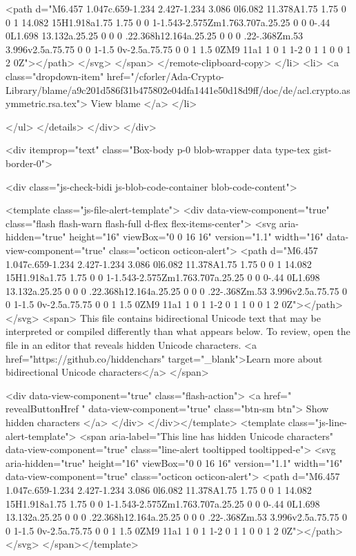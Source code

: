     <path d="M6.457 1.047c.659-1.234 2.427-1.234 3.086 0l6.082 11.378A1.75 1.75 0 0 1 14.082 15H1.918a1.75 1.75 0 0 1-1.543-2.575Zm1.763.707a.25.25 0 0 0-.44 0L1.698 13.132a.25.25 0 0 0 .22.368h12.164a.25.25 0 0 0 .22-.368Zm.53 3.996v2.5a.75.75 0 0 1-1.5 0v-2.5a.75.75 0 0 1 1.5 0ZM9 11a1 1 0 1 1-2 0 1 1 0 0 1 2 0Z"></path>
</svg>
</span>
</remote-clipboard-copy>            </li>
            <li>
              <a class="dropdown-item" href="/cforler/Ada-Crypto-Library/blame/a9c201d586f31b475802e04dfa1441e50d18d9ff/doc/de/acl.crypto.asymmetric.rsa.tex">
                View blame
              </a>
            </li>

        </ul>
      </details>
    </div>
</div>


      
    <div itemprop="text" class="Box-body p-0 blob-wrapper data type-tex  gist-border-0">

        
<div class="js-check-bidi js-blob-code-container blob-code-content">

  <template class="js-file-alert-template">
  <div data-view-component="true" class="flash flash-warn flash-full d-flex flex-items-center">
  <svg aria-hidden="true" height="16" viewBox="0 0 16 16" version="1.1" width="16" data-view-component="true" class="octicon octicon-alert">
    <path d="M6.457 1.047c.659-1.234 2.427-1.234 3.086 0l6.082 11.378A1.75 1.75 0 0 1 14.082 15H1.918a1.75 1.75 0 0 1-1.543-2.575Zm1.763.707a.25.25 0 0 0-.44 0L1.698 13.132a.25.25 0 0 0 .22.368h12.164a.25.25 0 0 0 .22-.368Zm.53 3.996v2.5a.75.75 0 0 1-1.5 0v-2.5a.75.75 0 0 1 1.5 0ZM9 11a1 1 0 1 1-2 0 1 1 0 0 1 2 0Z"></path>
</svg>
    <span>
      This file contains bidirectional Unicode text that may be interpreted or compiled differently than what appears below. To review, open the file in an editor that reveals hidden Unicode characters.
      <a href="https://github.co/hiddenchars" target="_blank">Learn more about bidirectional Unicode characters</a>
    </span>


  <div data-view-component="true" class="flash-action">        <a href="{{ revealButtonHref }}" data-view-component="true" class="btn-sm btn">    Show hidden characters
</a>
</div>
</div></template>
<template class="js-line-alert-template">
  <span aria-label="This line has hidden Unicode characters" data-view-component="true" class="line-alert tooltipped tooltipped-e">
    <svg aria-hidden="true" height="16" viewBox="0 0 16 16" version="1.1" width="16" data-view-component="true" class="octicon octicon-alert">
    <path d="M6.457 1.047c.659-1.234 2.427-1.234 3.086 0l6.082 11.378A1.75 1.75 0 0 1 14.082 15H1.918a1.75 1.75 0 0 1-1.543-2.575Zm1.763.707a.25.25 0 0 0-.44 0L1.698 13.132a.25.25 0 0 0 .22.368h12.164a.25.25 0 0 0 .22-.368Zm.53 3.996v2.5a.75.75 0 0 1-1.5 0v-2.5a.75.75 0 0 1 1.5 0ZM9 11a1 1 0 1 1-2 0 1 1 0 0 1 2 0Z"></path>
</svg>
</span></template>

